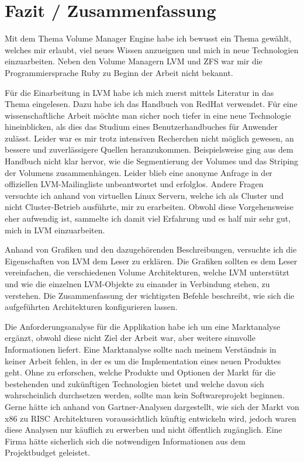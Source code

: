 \chapter{Fazit / Zusammenfassung}
\label{cha:Fazit}

Mit dem Thema Volume Manager Engine habe ich bewusst ein Thema gewählt, welches mir erlaubt, viel neues Wissen anzueignen und mich in neue Technologien einzuarbeiten. Neben den Volume Managern LVM und ZFS war mir die Programmiersprache Ruby zu Beginn der Arbeit nicht bekannt.

Für die Einarbeitung in LVM habe ich mich zuerst mittels Literatur in das Thema eingelesen. Dazu habe ich das Handbuch von RedHat verwendet. Für eine wissenschaftliche Arbeit möchte man sicher noch tiefer in eine neue Technologie hineinblicken, als dies das Studium eines Benutzerhandbuches für Anwender zulässt. Leider war es mir trotz intensiven Recherchen nicht möglich gewesen, an bessere und zuverlässigere Quellen heranzukommen. Beispielsweise ging aus dem Handbuch nicht klar hervor, wie die Segmentierung der Volumes und das Striping der Volumens zusammenhängen. Leider blieb eine anonyme Anfrage in der offiziellen LVM-Mailingliste unbeantwortet und erfolglos.
Andere Fragen versuchte ich anhand von virtuellen Linux Servern, welche ich als Cluster und nicht Cluster-Betrieb ausführte, mir zu erarbeiten. Obwohl diese Vorgehensweise eher aufwendig ist, sammelte ich damit viel Erfahrung und es half mir sehr gut, mich in LVM einzuarbeiten.
 
Anhand von Grafiken und den dazugehörenden Beschreibungen, versuchte ich die Eigenschaften von LVM dem Leser zu erklären. Die Grafiken sollten es dem Leser vereinfachen, die verschiedenen Volume Architekturen, welche LVM unterstützt und wie die einzelnen LVM-Objekte zu einander in Verbindung stehen, zu verstehen. Die Zusammenfassung der wichtigsten Befehle beschreibt, wie sich die aufgeführten Architekturen konfigurieren lassen.
 
Die Anforderungsanalyse für die Applikation habe ich um eine Marktanalyse ergänzt, obwohl diese nicht Ziel der Arbeit war, aber weitere sinnvolle Informationen liefert. Eine Marktanalyse sollte nach meinem Verständnis in keiner Arbeit fehlen, in der es um die Implementation eines neuen Produktes geht. Ohne zu erforschen, welche Produkte und Optionen der Markt für die bestehenden und zukünftigen Technologien bietet und welche davon sich wahrscheinlich durchsetzen werden, sollte man kein Softwareprojekt beginnen. Gerne hätte ich anhand von Gartner-Analysen dargestellt, wie sich der Markt von x86 zu RISC Architekturen voraussichtlich künftig entwickeln wird, jedoch waren diese Analysen nur käuflich zu erwerben und nicht öffentlich zugänglich. Eine Firma hätte sicherlich sich die notwendigen Informationen aus dem Projektbudget geleistet. 
  
